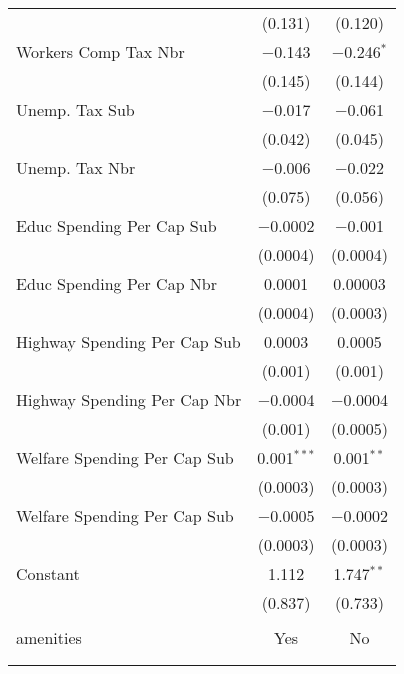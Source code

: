 \begin{table}[!htbp]
\begin{tabular}{@{\extracolsep{5pt}}lcc}
  & (0.131) & (0.120) \\ 
  Workers Comp Tax Nbr & $-$0.143 & $-$0.246$^{*}$ \\ 
  & (0.145) & (0.144) \\ 
  Unemp. Tax Sub & $-$0.017 & $-$0.061 \\ 
  & (0.042) & (0.045) \\ 
  Unemp. Tax Nbr & $-$0.006 & $-$0.022 \\ 
  & (0.075) & (0.056) \\ 
  Educ Spending Per Cap Sub & $-$0.0002 & $-$0.001 \\ 
  & (0.0004) & (0.0004) \\ 
  Educ Spending Per Cap Nbr & 0.0001 & 0.00003 \\ 
  & (0.0004) & (0.0003) \\ 
  Highway Spending Per Cap Sub & 0.0003 & 0.0005 \\ 
  & (0.001) & (0.001) \\ 
  Highway Spending Per Cap Nbr & $-$0.0004 & $-$0.0004 \\ 
  & (0.001) & (0.0005) \\ 
  Welfare Spending Per Cap Sub & 0.001$^{***}$ & 0.001$^{**}$ \\ 
  & (0.0003) & (0.0003) \\ 
  Welfare Spending Per Cap Sub & $-$0.0005 & $-$0.0002 \\ 
  & (0.0003) & (0.0003) \\ 
  Constant & 1.112 & 1.747$^{**}$ \\ 
  & (0.837) & (0.733) \\ 
 \hline \\[-1.8ex] 
amenities & Yes & No \\ 
\hline \\[-1.8ex] 
\hline 
\hline \\[-1.8ex] 
\end{tabular} 
\end{table} 

